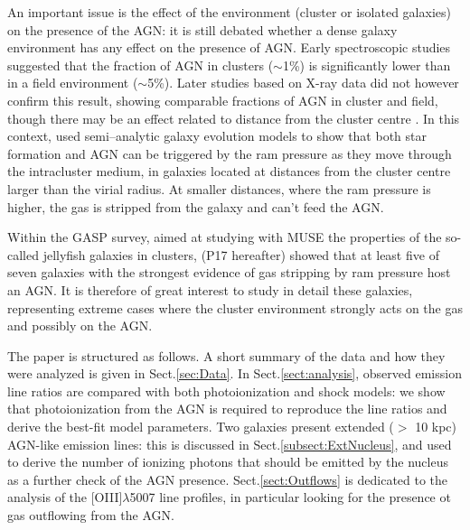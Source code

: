 \documentclass[fleqn,usenatbib]{mnras}
\begin{document}
An important issue is the effect of the environment (cluster or isolated galaxies) on the presence of the AGN: it is still debated  \citep[see e.g.][and refs]{2017A&A...599A..83M} whether a dense galaxy environment has any effect on the presence of AGN. Early spectroscopic studies  \citep{1985ApJ...288..481D} suggested that the fraction of AGN in clusters ($\sim$1\%) is significantly lower than in a field environment ($\sim$5\%). Later studies based on X-ray data \citep{2013MNRAS.429.1827P} did not however confirm this result, showing comparable fractions of AGN in cluster and field, though there may be an effect related to distance from the cluster centre \citep{2014MNRAS.437.1942E}. 
In this context, \citet{2018MNRAS.474.3615M} used semi--analytic galaxy evolution models to show that   both star formation and AGN can be triggered by the ram pressure as they move through the intracluster medium, in galaxies located at  distances from the cluster centre larger than the virial radius.
At smaller distances, where the  ram pressure is higher, the gas is stripped from the galaxy and can't feed the AGN.

Within the GASP survey, aimed at studying with MUSE the properties of the so-called jellyfish galaxies in clusters, \citet{2017ApJ...844...48P} (P17 hereafter) showed that at least five of  seven galaxies with the strongest evidence of gas stripping by ram pressure  \citep{2018MNRAS.476.4753J} host an AGN.  It is therefore  of great interest to study in detail these galaxies, representing extreme cases where the cluster environment strongly acts on the gas and possibly on the AGN. 

The paper is structured as follows.  A short summary of  the data and how they were analyzed is given in Sect.\ref{sec:Data}. In Sect.\ref{sect:analysis}, observed emission line ratios are compared with both photoionization and shock models: we show that photoionization from the AGN is required to reproduce the line ratios and derive the best-fit model parameters. Two galaxies present extended ($>$ 10 kpc) AGN-like emission lines: this is discussed in 
Sect.\ref{subsect:ExtNucleus}, and used to derive the number of ionizing photons that should be emitted by the nucleus as a further check of the AGN presence.
Sect.\ref{sect:Outflows} is dedicated to the analysis of the [OIII]$\lambda$5007 line profiles, in particular looking for the presence ot gas outflowing from the AGN.
\end{document}

